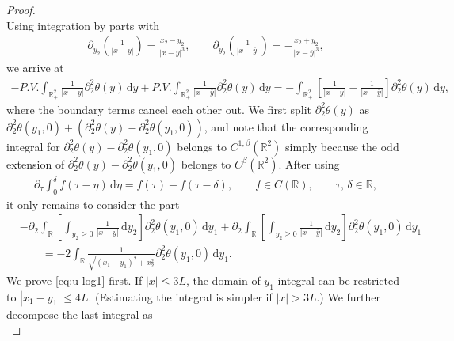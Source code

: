 \documentclass[10pt]{amsart}
\theoremstyle{definition}
\theoremstyle{remark}
\numberwithin{equation}{section}
\newcommand{\ud}{\mathrm{d}}
\newcommand{\rd}{\partial}
\newcommand{\0}{\emptyset}
\newcommand{\bt}{\beta}
\newcommand{\tht}{\theta}
\newcommand{\bbR}{\mathbb R}
\begin{document}
\begin{proof}
\begin{equation*}
		\end{equation*} Using integration by parts with \begin{equation*}
			\begin{split}
				\rd_{y_2} \left( \frac{1}{|x-y|} \right) = \frac{x_2-y_2}{|x-y|^3}, \qquad \rd_{y_2} \left( \frac{1}{|x-\overline{y}|} \right) = -\frac{x_2+y_2}{|x-\overline{y}|^3},
			\end{split}
		\end{equation*} we arrive at \begin{equation*}
			\begin{split}
				- P.V. \int_{\bbR^2_{+}} \frac{1}{|x-y|} \partial_2^2 \tht(y) \,\ud y + P.V. \int_{\bbR^2_{+}} \frac{1}{|x-\overline{y}|} \partial_2^2 \tht(y) \,\ud y = - \int_{\bbR^2_{+}} \left[ \frac{1}{|x-y|} - \frac{1}{|x-\overline{y}|} \right] \partial_2^2 \tht(y) \,\ud y,
			\end{split}
		\end{equation*} where the boundary terms cancel each other out. We first split $\partial_2^2 \tht(y)$ as $\partial_2^2 \tht(y_1,0) + (\partial_2^2 \tht(y)- \partial_2^2 \tht(y_1,0))$, and note that the corresponding integral for $\partial_2^2 \tht(y)- \partial_2^2 \tht(y_1,0)$ belongs to $C^{1,\bt}(\bbR^2)$ simply because the odd extension of $\partial_2^2\tht(y)-\partial_2^2 \tht(y_1,0)$ belongs to $C^\bt(\bbR^2)$. After using \begin{equation*}
			\begin{split}
				\partial_\tau \int_{0}^{\delta} f(\tau-\eta) \,\ud \eta = f(\tau) - f(\tau - \delta), \qquad f \in C(\bbR), \qquad \tau,\, \delta \in \bbR,
			\end{split}
		\end{equation*} it only remains to consider the part  \begin{equation}\label{eq:log_term}
			\begin{split}
				&- \partial_2 \int_{\bbR} \left[ \int_{y_2 \ge 0} \frac{1}{|x-y|} \,\ud y_2 \right] \partial_2^2 \tht(y_1,0) \,\ud y_1 + \partial_2 \int_{\bbR} \left[ \int_{y_2 \ge 0} \frac{1}{|x-\overline{y}|} \,\ud y_2 \right] \partial_2^2 \tht(y_1,0) \,\ud y_1 \\
				&\qquad= -2 \int_{\bbR} \frac{1}{ \sqrt{ (x_1-y_1)^2 + x_2^2 }  } \rd_{2}^2 \tht(y_1,0) \, \ud y_1.
			\end{split}
		\end{equation}  We prove \eqref{eq:u-log1} first. If $|x| \le 3L$, the domain of $y_1$ integral can be restricted to $|x_1-y_1| \le 4L$. (Estimating the integral is simpler if $|x|>3L$.) We further decompose the last integral as \begin{equation*}

\end{equation*}
\end{proof}
\end{document}
